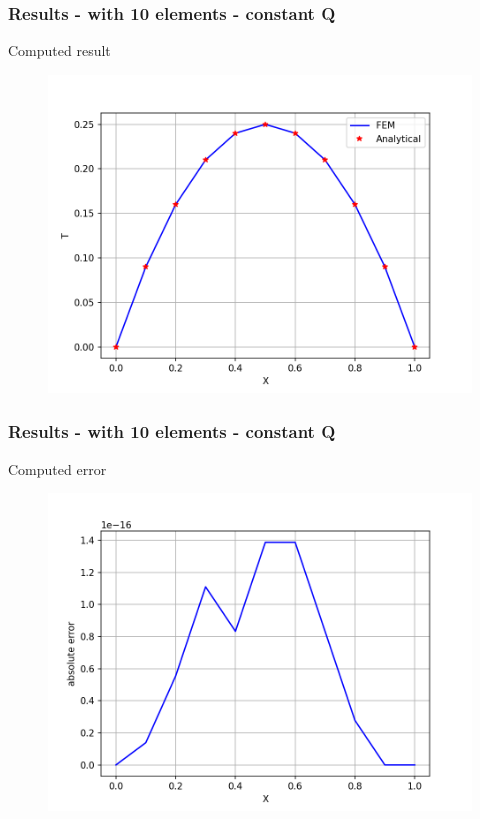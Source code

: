 \begin{frame}
	\frametitle{Results - with 10 elements - constant Q}
	Computed result
	\begin{figure}
		\includegraphics[scale=0.5]{supportingFiles/results_constantQ/output_10.png}
	\end{figure}
\end{frame}

\begin{frame}
	\frametitle{Results - with 10 elements - constant Q}
	Computed error
	\begin{figure}
		\includegraphics[scale=0.5]{supportingFiles/results_constantQ/error_10.png}
	\end{figure}
\end{frame}

